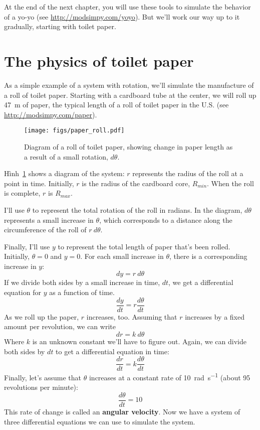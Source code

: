 \documentclass[12pt]{book}
\theoremstyle{exercise}
\begin{document}
At the end of the next chapter, you will use these tools to simulate the behavior of a yo-yo (see \url{http://modsimpy.com/yoyo}).  But we'll work our way up to it gradually, starting with toilet paper.



\section{The physics of toilet paper}
\label{paper}

As a simple example of a system with rotation, we'll simulate the manufacture of a roll of toilet paper.  Starting with a cardboard tube at the center, we will roll up \SI{47}{\meter} of paper, the typical length of a roll of toilet paper in the U.S. (see \url{http://modsimpy.com/paper}).


\begin{figure}
\centerline{\texttt{[image: figs/paper\_roll.pdf]}}
\caption{Diagram of a roll of toilet paper, showing change in paper length as a result of a small rotation, $d\theta$.}
\label{paper_roll}
\end{figure}

Hình~\ref{paper_roll} shows a diagram of the system: $r$ represents the radius of the roll at a point in time.  Initially, $r$ is the radius of the cardboard core, $R_{min}$.  When the roll is complete, $r$ is $R_{max}$.

I'll use $\theta$ to represent the total rotation of the roll in radians.  In the diagram, $d\theta$ represents a small increase in $\theta$, which corresponds to a distance along the circumference of the roll of $r~d\theta$.


Finally, I'll use $y$ to represent the total length of paper that's been rolled.  Initially, $\theta=0$ and $y=0$.  For each small increase in $\theta$, there is a corresponding increase in $y$:
%
\[ dy = r~d\theta \]
%
If we divide both sides by a small increase in time, $dt$, we get a differential equation for $y$ as a function of time.
%
\[ \frac{dy}{dt} = r \frac{d\theta}{dt} \]
%
As we roll up the paper, $r$ increases, too.  Assuming that $r$ increases by a fixed amount per revolution, we can write
%
\[ dr = k~d\theta \]
%
Where $k$ is an unknown constant we'll have to figure out.  Again, we can divide both sides by $dt$ to get a differential equation in time:
%
\[ \frac{dr}{dt} = k \frac{d\theta}{dt} \]
%
Finally, let's assume that $\theta$ increases at a constant rate of \SI{10}{\radian\per\second} (about 95 revolutions per minute):
%
\[ \frac{d\theta}{dt} = 10  \]
%
This rate of change is called an {\bf angular velocity}.  Now we have a system of three differential equations we can use to simulate the system.
\end{document}

